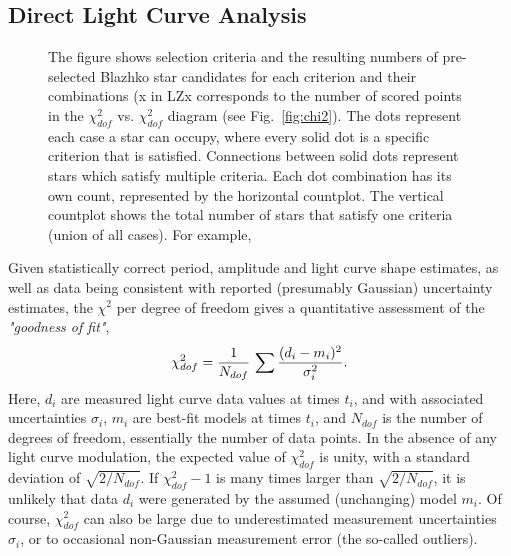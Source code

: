 
\subsection{Direct Light Curve Analysis}

\begin{figure}[ht]
    \centering
    \vskip -0.1in
    \caption{The figure shows selection criteria and the resulting numbers of pre-selected Blazhko star candidates for each
      criterion and their combinations (x in LZx corresponds to the number of scored points in the $\chi^2_{dof}$ vs. $\chi^2_{dof}$
      diagram (see Fig.~\ref{fig:chi2}). The dots represent each case a star can occupy, where every solid dot is a specific
      criterion that is satisfied. Connections between solid dots represent stars which satisfy multiple criteria. Each dot
      combination has its own count, represented by the horizontal countplot. The vertical countplot shows the total number
      of stars that satisfy one criteria (union of all cases). For
      example, }
      \label{fig:selstats}
    \end{figure}
    
Given statistically correct period, amplitude and light curve shape estimates,
as well as data being consistent with reported (presumably Gaussian) uncertainty estimates, the $\chi^2$ per degree
of freedom gives a quantitative assessment of the \textit{"goodness of fit"},
\begin{equation}
        \chi_{dof}^2 = {1 \over N_{dof}} \, \sum{\frac{(d_i - m_i)^2}{\sigma_i^2}}.
\end{equation}
Here, $d_i$ are measured light curve data values at times $t_i$, and with associated uncertainties $\sigma_i$,
$m_i$ are best-fit models at times $t_i$, and $N_{dof}$ is the number of degrees of freedom, essentially the
number of data points. In the absence of any light curve modulation, the expected value of $\chi^2_{dof}$ is
unity, with a standard deviation of $\sqrt{2/N_{dof}}$.  If $\chi^2_{dof} - 1$ is many times  larger than 
$\sqrt{2/N_{dof}}$, it is unlikely that data $d_i$ were generated by the assumed (unchanging) model $m_i$.  
Of course, $\chi^2_{dof}$ can also be large due to underestimated measurement uncertainties $\sigma_i$,
or to occasional non-Gaussian measurement error (the so-called outliers). 

